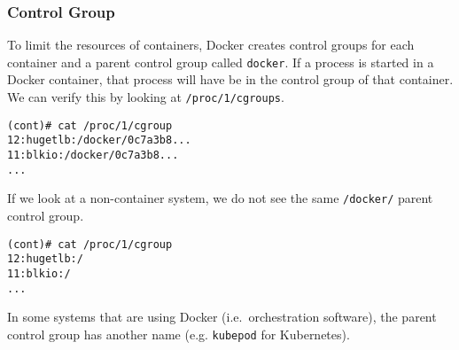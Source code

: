 \subsubsection{Control Group}
To limit the resources of containers, Docker creates control groups for each container and a parent control group called \lstinline{docker}. If a process is started in a Docker container, that process will have be in the control group of that container. We can verify this by looking at \lstinline{/proc/1/cgroups}\cite{Metasploit-Linux-Gather-Container-Detection}.

\begin{lstlisting}[caption={Process control group inside container\protect\footnotemark},captionpos=b]
(cont)# cat /proc/1/cgroup
12:hugetlb:/docker/0c7a3b8...
11:blkio:/docker/0c7a3b8...
...
\end{lstlisting}

If we look at a non-container system, we do not see the same \lstinline{/docker/} parent control group.
\begin{lstlisting}[caption={Process control groups on host},captionpos=b]
(cont)# cat /proc/1/cgroup
12:hugetlb:/
11:blkio:/
...
\end{lstlisting}

In some systems that are using Docker (i.e.\ orchestration software), the parent control group has another name (e.g. \lstinline{kubepod} for Kubernetes).
